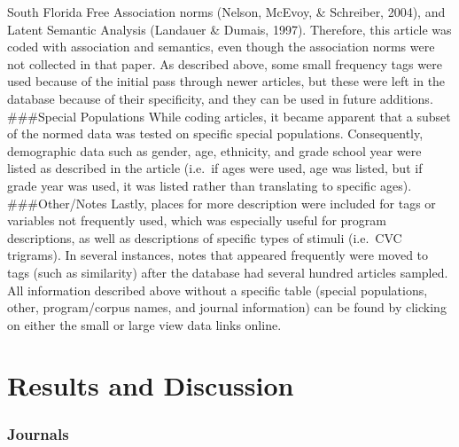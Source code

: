 \documentclass[english,man]{apa6}
\theoremstyle{definition}
\theoremstyle{definition}
\theoremstyle{definition}
\theoremstyle{remark}
\begin{document}
South Florida Free Association norms (Nelson, McEvoy, \& Schreiber,
2004), and Latent Semantic Analysis (Landauer \& Dumais, 1997).
Therefore, this article was coded with association and semantics, even
though the association norms were not collected in that paper. As
described above, some small frequency tags were used because of the
initial pass through newer articles, but these were left in the database
because of their specificity, and they can be used in future additions.
\#\#\#Special Populations While coding articles, it became apparent that
a subset of the normed data was tested on specific special populations.
Consequently, demographic data such as gender, age, ethnicity, and grade
school year were listed as described in the article (i.e.~if ages were
used, age was listed, but if grade year was used, it was listed rather
than translating to specific ages). \#\#\#Other/Notes Lastly, places for
more description were included for tags or variables not frequently
used, which was especially useful for program descriptions, as well as
descriptions of specific types of stimuli (i.e.~CVC trigrams). In
several instances, notes that appeared frequently were moved to tags
(such as similarity) after the database had several hundred articles
sampled. All information described above without a specific table
(special populations, other, program/corpus names, and journal
information) can be found by clicking on either the small or large view
data links online.

\section{Results and Discussion}\label{results-and-discussion}

\subsubsection{Journals}\label{journals}
\end{document}
